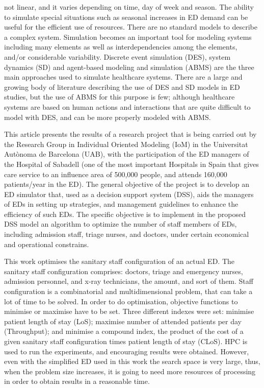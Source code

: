 \documentclass[11pt]{article} %
\begin{document}
not linear, and it varies depending on time, day of week and season. The ability to simulate special situations such as seasonal 
increases in ED demand can be useful for the efficient use of resources. There are no standard models to describe a complex system. 
Simulation becomes an important tool for modeling systems including many elements as well as interdependencies among the 
elements, and/or considerable variability. Discrete event simulation (DES), system dynamics (SD) and agent-based modeling and 
simulation (ABMS) are the three main approaches used to simulate healthcare systems. There are a large and  growing body of 
literature describing the use of DES and SD models in ED studies, but the use of ABMS for this purpose is few; although healthcare 
systems are based on human actions and interactions that are quite difficult to model with DES, and can be more properly modeled 
with ABMS. 

This article presents the results of a research project that is being carried out by the Research Group in Individual Oriented 
Modeling (IoM) in the Universitat Aut\`onoma de Barcelona (UAB), with the participation of the ED managers of the Hospital of 
Sabadell  (one of the most important Hospitals in Spain that gives care service to an influence area of 500,000 people, and attends 
160,000 patients/year in the ED). The general objective of the project is to develop an ED simulator that, used as a decision support 
system (DSS), aids the managers of EDs in setting up strategies, and management guidelines to enhance the efficiency of such EDs. 
The specific objective is to implement in the proposed DSS model an algorithm to optimize the number of staff members of EDs, 
including admission staff, triage nurses, and doctors, under certain economical and operational constrains. 

This work optimises the sanitary staff configuration of an actual ED. The sanitary staff configuration comprises: doctors, triage and emergency nurses, admission personnel, and x-ray technicians, the amount, and sort of them. Staff configuration is a combinatorial and multidimensional problem, that can take a lot of time to be solved. In order to do optimisation, objective functions to minimise or maximise have to be set. Three different indexes were set: minimise patient length of stay (LoS); maximise number of attended patients per day (Throughput); and minimise a compound index, the product of the cost of a given sanitary staff configuration times patient length of stay (CLoS). HPC is used to run the experiments, and encouraging results were obtained. However, even with the simplified ED used in this work the search space is very large, thus, when the problem size increases, it is going to need more resources of processing in order to obtain results in a reasonable time.
\end{document}
